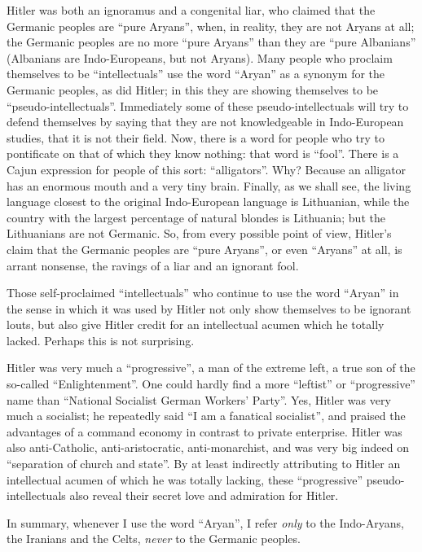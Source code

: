 Hitler was both an ignoramus and a congenital liar, who claimed that the Germanic peoples are ``pure Aryans'', when, in reality, they are not Aryans at all; the Germanic peoples are no more ``pure Aryans'' than they are ``pure Albanians'' (Albanians are Indo-Europeans, but not Aryans). Many people who proclaim themselves to be ``intellectuals'' use the word ``Aryan'' as a synonym for the Germanic peoples, as did Hitler; in this they are showing themselves to be ``pseudo-intellectuals''. Immediately some of these pseudo-intellectuals will try to defend themselves by saying that they are not knowledgeable in Indo-European studies, that it is not their field. Now, there is a word for people who try to pontificate on that of which they know nothing: that word is ``fool''. There is a Cajun expression for people of this sort: ``alligators''. Why? Because an alligator has an enormous mouth and a very tiny brain. Finally, as we shall see, the living language closest to the original Indo-European language is Lithuanian, while the country with the largest percentage of natural blondes is Lithuania; but the Lithuanians are not Germanic. So, from every possible point of view, Hitler's claim that the Germanic peoples are ``pure Aryans'', or even ``Aryans'' at all, is arrant nonsense, the ravings of a liar and an ignorant fool.

Those self-proclaimed ``intellectuals'' who continue to use the word ``Aryan'' in the sense in which it was used by Hitler not only show themselves to be ignorant louts, but also give Hitler credit for an intellectual acumen which he totally lacked. Perhaps this is not surprising.

Hitler was very much a ``progressive'', a man of the extreme left, a true son of the so-called ``Enlightenment''. One could hardly find a more ``leftist'' or ``progressive'' name than ``National Socialist German Workers' Party''. Yes, Hitler was very much a socialist; he repeatedly said ``I am a fanatical socialist'', and praised the advantages of a command economy in contrast to private enterprise. Hitler was also anti-Catholic, anti-aristocratic, anti-monarchist, and was very big indeed on ``separation of church and state''. By at least indirectly attributing to Hitler an intellectual acumen of which he was totally lacking, these ``progressive'' pseudo-intellectuals also reveal their secret love and admiration for Hitler.

In summary, whenever I use the word ``Aryan'', I refer \emph{only} to the Indo-Aryans, the Iranians and the Celts, \emph{never} to the Germanic peoples.

